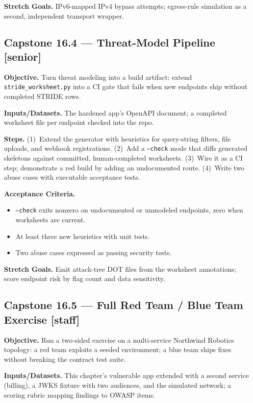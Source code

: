 \textbf{Stretch Goals.} IPv6-mapped IPv4 bypass attempts; egress-rule
simulation as a second, independent transport wrapper.

\subsection*{Capstone 16.4 --- Threat-Model Pipeline \textbf{[senior]}}

\textbf{Objective.} Turn threat modeling into a build artifact: extend
\texttt{stride\_worksheet.py} into a CI gate that fails when new endpoints
ship without completed STRIDE rows.

\textbf{Inputs/Datasets.} The hardened app's OpenAPI document; a completed
worksheet file per endpoint checked into the repo.

\textbf{Steps.} (1)~Extend the generator with heuristics for query-string
filters, file uploads, and webhook registrations. (2)~Add a
\texttt{--check} mode that diffs generated skeletons against committed,
human-completed worksheets. (3)~Wire it as a CI step; demonstrate a red
build by adding an undocumented route. (4)~Write two abuse cases with
executable acceptance tests.

\textbf{Acceptance Criteria.}
\begin{itemize}[itemsep=0.2em]
  \item[$\square$] \texttt{--check} exits nonzero on undocumented or
        unmodeled endpoints, zero when worksheets are current.
  \item[$\square$] At least three new heuristics with unit tests.
  \item[$\square$] Two abuse cases expressed as passing security tests.
\end{itemize}

\textbf{Stretch Goals.} Emit attack-tree DOT files from the worksheet
annotations; score endpoint risk by flag count and data sensitivity.

\subsection*{Capstone 16.5 --- Full Red Team / Blue Team Exercise \textbf{[staff]}}

\textbf{Objective.} Run a two-sided exercise on a multi-service Northwind
Robotics topology: a red team exploits a seeded environment; a blue team
ships fixes without breaking the contract test suite.

\textbf{Inputs/Datasets.} This chapter's vulnerable app extended with a
second service (billing), a JWKS fixture with two audiences, and the
simulated network; a scoring rubric mapping findings to OWASP items.

